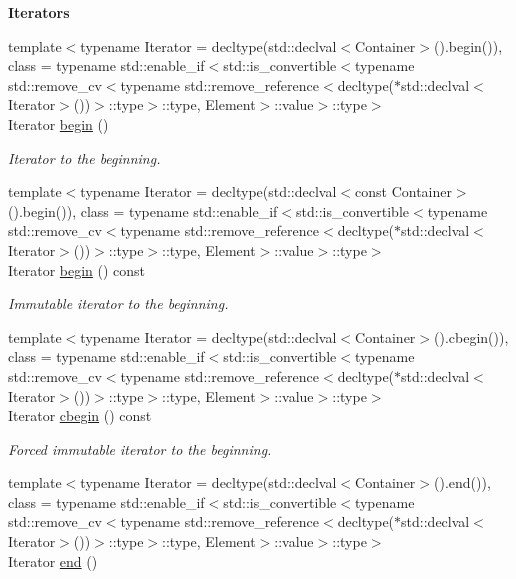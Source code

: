 \begin{Indent}{\bf Iterators}\par
\begin{DoxyCompactItemize}
\item 
{\footnotesize template$<$typename Iterator  = decltype(std\-::declval$<$\-Container$>$().\-begin()), class  = typename std\-::enable\-\_\-if$<$std\-::is\-\_\-convertible$<$typename std\-::remove\-\_\-cv$<$typename std\-::remove\-\_\-reference$<$decltype($\ast$std\-::declval$<$\-Iterator$>$())$>$\-::type$>$\-::type, Element$>$\-::value$>$\-::type$>$ }\\Iterator \hyperlink{exceptionmagrathea_1_1SimpleHyperOctree_ad9be0e403527cf8c64d50ce27595800a}{begin} ()
\begin{DoxyCompactList}\small\item\em Iterator to the beginning. \end{DoxyCompactList}\item 
{\footnotesize template$<$typename Iterator  = decltype(std\-::declval$<$const Container$>$().\-begin()), class  = typename std\-::enable\-\_\-if$<$std\-::is\-\_\-convertible$<$typename std\-::remove\-\_\-cv$<$typename std\-::remove\-\_\-reference$<$decltype($\ast$std\-::declval$<$\-Iterator$>$())$>$\-::type$>$\-::type, Element$>$\-::value$>$\-::type$>$ }\\Iterator \hyperlink{exceptionmagrathea_1_1SimpleHyperOctree_a09485be0e49e3f98a39eb51997f297ee}{begin} () const 
\begin{DoxyCompactList}\small\item\em Immutable iterator to the beginning. \end{DoxyCompactList}\item 
{\footnotesize template$<$typename Iterator  = decltype(std\-::declval$<$\-Container$>$().\-cbegin()), class  = typename std\-::enable\-\_\-if$<$std\-::is\-\_\-convertible$<$typename std\-::remove\-\_\-cv$<$typename std\-::remove\-\_\-reference$<$decltype($\ast$std\-::declval$<$\-Iterator$>$())$>$\-::type$>$\-::type, Element$>$\-::value$>$\-::type$>$ }\\Iterator \hyperlink{exceptionmagrathea_1_1SimpleHyperOctree_a6aea97a026d32ccd56c38947ca0753d1}{cbegin} () const 
\begin{DoxyCompactList}\small\item\em Forced immutable iterator to the beginning. \end{DoxyCompactList}\item 
{\footnotesize template$<$typename Iterator  = decltype(std\-::declval$<$\-Container$>$().\-end()), class  = typename std\-::enable\-\_\-if$<$std\-::is\-\_\-convertible$<$typename std\-::remove\-\_\-cv$<$typename std\-::remove\-\_\-reference$<$decltype($\ast$std\-::declval$<$\-Iterator$>$())$>$\-::type$>$\-::type, Element$>$\-::value$>$\-::type$>$ }\\Iterator \hyperlink{exceptionmagrathea_1_1SimpleHyperOctree_a8ba63ec23ee998718633989748bb84db}{end} ()

\end{DoxyCompactItemize}
\end{Indent}
